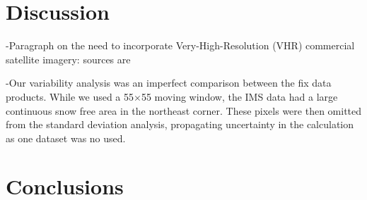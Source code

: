 \hypertarget{ch5-discussion}{\section{Discussion}\label{ch4-discussion}}

-Paragraph on the need to incorporate Very-High-Resolution (VHR) commercial satellite imagery: sources are \citep{huImprovingMountainSnow2022, thalerEstimatingSnowCover2023,yangHighresolutionMappingSnow2023,johnHighResolutionSnowCoveredArea2022}


-Our variability analysis was an imperfect comparison between the fix data products. While we used a 55$\times$55 moving window, the IMS data had a large continuous snow free area in the northeast corner. These pixels were then omitted from the standard deviation analysis, propagating uncertainty in the calculation as one dataset was no used.


\hypertarget{ch6-conclusions}{\section{Conclusions}\label{ch6-conclusions}}



\clearpage


